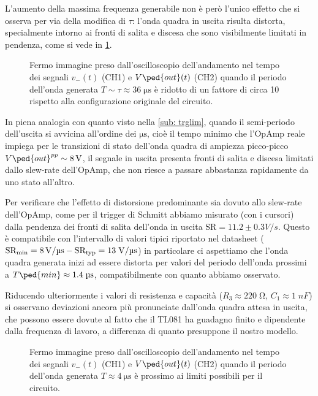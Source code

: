 \documentclass[10pt, a4paper, italian]{article}
\begin{document}
L'aumento della massima frequenza generabile non è però l'unico effetto che
si osserva per via della modifica di $\tau$: l'onda quadra in uscita risulta
distorta, specialmente intorno ai fronti di salita e discesa che sono
visibilmente limitati in pendenza, come si vede in \cref{fig: astable1nF}.
\begin{figure}[htbp]
	\centering
	\caption{Fermo immagine preso dall'oscilloscopio dell'andamento nel tempo dei
	segnali $v_- (t)$ (CH1) e $V\ped{out} (t)$ (CH2) quando il periodo dell'onda
	generata $T \sim \tau \approx 36 \; \si{\micro\s}$ è ridotto di un fattore di
	circa 10 rispetto alla configurazione originale del circuito.
	\label{fig: astable1nF}}
\end{figure}

In piena analogia con quanto visto nella \cref{sub: trglim}, quando il
semi-periodo dell'uscita si avvicina all'ordine dei $\si{\micro\s}$, cioè il
tempo minimo che l'OpAmp reale impiega per le transizioni di stato dell'onda
quadra di ampiezza picco-picco $V\ped{out}^{pp} \sim \SI{8}{\V}$, il segnale
in uscita presenta fronti di salita e discesa limitati dallo slew-rate
dell'OpAmp, che non riesce a passare abbastanza rapidamente da uno stato
all'altro.

Per verificare che l'effetto di distorsione predominante sia dovuto allo
slew-rate dell'OpAmp, come per il trigger di Schmitt abbiamo misurato (con
i cursori) dalla pendenza dei fronti di salita dell'onda in uscita
$\mathrm{SR} = 11.2 \pm 0.3 \si{V/s}$. Questo è compatibile con l'intervallo
di valori tipici riportato nel datasheet
($\rm SR_{min} = \SI{8}{\V/\micro\s} - SR_{typ} = 13 \; \si{\V/\micro\s}$)
in particolare ci aspettiamo che l'onda quadra generata inizi ad essere
distorta per valori del periodo dell'onda prossimi a
$T\ped{min} \approx 1.4 \; \si{\micro\s}$, compatibilmente con quanto abbiamo
osservato.

Riducendo ulteriormente i valori di resistenza e capacità
($R_3 \approx 220 \; \si{\ohm}$, $C_1 \approx 1 \; \si{nF}$) si osservano
deviazioni ancora più pronunciate dall'onda quadra attesa in uscita, che
possono essere dovute al fatto che il TL081 ha guadagno finito e dipendente
dalla frequenza di lavoro, a differenza di quanto presuppone il nostro modello. 
\begin{figure}[htbp]
	\centering
	\caption{Fermo immagine preso dall'oscilloscopio dell'andamento nel tempo dei
	segnali $v_- (t)$ (CH1) e $V\ped{out} (t)$ (CH2) quando il periodo dell'onda
	generata $T \approx \SI{4}{\micro\s}$ è prossimo ai limiti possibili per il
	circuito. \label{fig: astable_lim}}
\end{figure}
\end{document}
